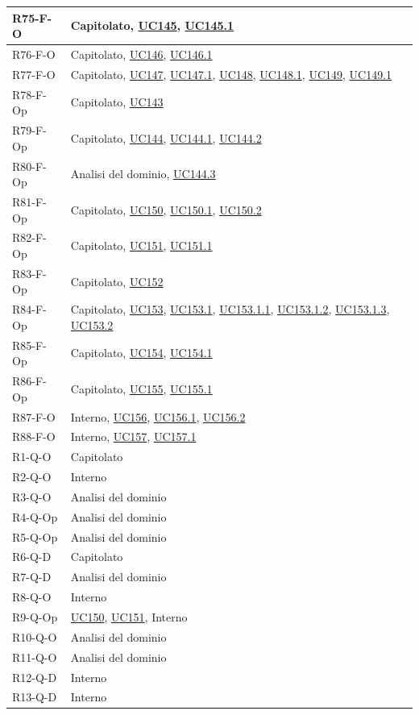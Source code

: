 \begin{longtable}{|p{2.8cm}|p{10.2cm}|}
	R75-F-O  & Capitolato, \hyperlink{uc145}{UC145}, \hyperlink{uc145.1}{UC145.1} \\ \hline
	R76-F-O  & Capitolato, \hyperlink{uc146}{UC146}, \hyperlink{uc146.1}{UC146.1} \\ \hline
	R77-F-O  & Capitolato, \hyperlink{uc147}{UC147}, \hyperlink{uc147.1}{UC147.1}, \hyperlink{uc148}{UC148}, \hyperlink{uc148.1}{UC148.1}, \hyperlink{uc149}{UC149}, \hyperlink{uc149.1}{UC149.1} \\ \hline
	R78-F-Op & Capitolato, \hyperlink{uc143}{UC143} \\ \hline
	R79-F-Op & Capitolato, \hyperlink{uc144}{UC144}, \hyperlink{uc144.1}{UC144.1}, \hyperlink{uc144.2}{UC144.2} \\ \hline
	R80-F-Op & Analisi del dominio, \hyperlink{uc144.3}{UC144.3} \\ \hline
	R81-F-Op & Capitolato, \hyperlink{uc150}{UC150}, \hyperlink{uc150.1}{UC150.1}, \hyperlink{uc150.2}{UC150.2} \\ \hline
	R82-F-Op & Capitolato, \hyperlink{uc151}{UC151}, \hyperlink{uc151.1}{UC151.1} \\ \hline
	R83-F-Op & Capitolato, \hyperlink{uc152}{UC152} \\ \hline
	R84-F-Op & Capitolato, \hyperlink{uc153}{UC153}, \hyperlink{uc153.1}{UC153.1}, \hyperlink{uc153.1.1}{UC153.1.1}, \hyperlink{uc153.1.2}{UC153.1.2}, \hyperlink{uc153.1.3}{UC153.1.3}, \hyperlink{uc153.2}{UC153.2} \\ \hline
	R85-F-Op & Capitolato, \hyperlink{uc154}{UC154}, \hyperlink{uc154.1}{UC154.1} \\ \hline
	R86-F-Op & Capitolato, \hyperlink{uc155}{UC155}, \hyperlink{uc155.1}{UC155.1} \\ \hline
	R87-F-O & Interno, \hyperlink{uc156}{UC156}, \hyperlink{uc156.1}{UC156.1}, \hyperlink{uc156.2}{UC156.2} \\ \hline
	R88-F-O & Interno, \hyperlink{uc157}{UC157}, \hyperlink{uc157.1}{UC157.1} \\ \hline

	R1-Q-O  & Capitolato \\ \hline
	R2-Q-O  & Interno \\ \hline
	R3-Q-O  & Analisi del dominio \\ \hline
	R4-Q-Op & Analisi del dominio \\ \hline
	R5-Q-Op & Analisi del dominio \\ \hline
	R6-Q-D  & Capitolato \\ \hline
	R7-Q-D  & Analisi del dominio \\ \hline
	R8-Q-O  & Interno \\ \hline
	R9-Q-Op & \hyperlink{uc150}{UC150}, \hyperlink{uc151}{UC151}, Interno \\ \hline
	R10-Q-O & Analisi del dominio \\ \hline
	R11-Q-O & Analisi del dominio \\ \hline
	R12-Q-D & Interno \\ \hline
	R13-Q-D & Interno \\ \hline


\end{longtable}
